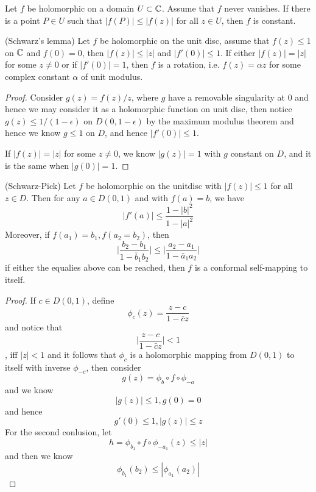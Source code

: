 \begin{proposition}
    Let $f$ be holomorphic on a domain $U\subset\mathbb{C}$. Assume that $f$ never vanishes. If there is a point $P\in U$ such that $|f(P)| \leq |f(z)|$ for all $z\in U$, then $f$ is constant. 
\end{proposition}

\begin{proposition}
    (Schwarz's lemma) Let $f$ be holomorphic on the unit disc, assume that $f(z) \leq 1$ on $\mathbb{C}$ and $f(0) = 0$, then $|f(z)| \leq |z|$ and $|f'(0)| \leq 1$.
    If either $|f(z)|=|z|$ for some $z\neq 0$ or if $|f'(0)| = 1$, then $f$ is a rotation, i.e. $f(z) = \alpha z$ for some complex constant $\alpha$ of unit modulus.
\end{proposition}
\begin{proof}
    Consider $g(z) = f(z)/z$, where $g$ have a removable singularity at $0$ and hence we may consider it as a holomorphic function on unit disc, then notice $g(z) \leq 1/(1-\epsilon)$ on $D(0,1-\epsilon)$ by the maximum modulus theorem and hence we know $g\leq 1$ on $D$, and hence $|f'(0)| \leq 1$.\par
    If $|f(z)| = |z|$ for some $z\neq 0$, we know $|g(z)| = 1$ with $g$ constant on $D$, and it is the same when $|g(0)| = 1$.
\end{proof}

\begin{theorem}
    (Schwarz-Pick) Let $f$ be holomorphic on the unitdisc with $|f(z)| \leq 1$ for all $z\in D$. Then for any $a\in D(0,1)$ and with $f(a) = b$, we have
    \[|f'(a)| \leq \dfrac{1-|b|^2}{1-|a|^2}\]
    Moreover, if $f(a_1)= b_1,f(a_2 = b_2)$, then
    \[\Big|\dfrac{b_2-b_1}{1-\bar{b}_1b_2}\Big| \leq \Big|\dfrac{a_2-a_1}{1-\bar{a}_1a_2}\Big|\]
    if either the equalies above can be reached, then $f$ is a conformal self-mapping to itself.
\end{theorem}
\begin{proof}
    If $c\in D(0,1)$, define
    \[\phi_c(z) = \dfrac{z-c}{1-\bar{c}z}\]
    and notice that
    \[\Big|\dfrac{z-c}{1-\bar{c}z}\Big| < 1\], iff $|z|<1$ and it follows that $\phi_c$ is a holomorphic mapping from $D(0,1)$ to itself with inverse $\phi_{-c}$, then consider
    \[g(z) = \phi_b\circ f \circ \phi_{-a}\]
    and we know
    \[|g(z)| \leq 1, g(0)=0\]
    and hence
    \[g'(0) \leq 1, |g(z)| \leq z\]
    For the second conlusion, let
    \[h = \phi_{b_1}\circ f\circ\phi_{-a_1}(z) \leq |z|\]
    and then we know
    \[\phi_{b_1}(b_2) \leq |\phi_{a_1}(a_2)|\]
\end{proof}

